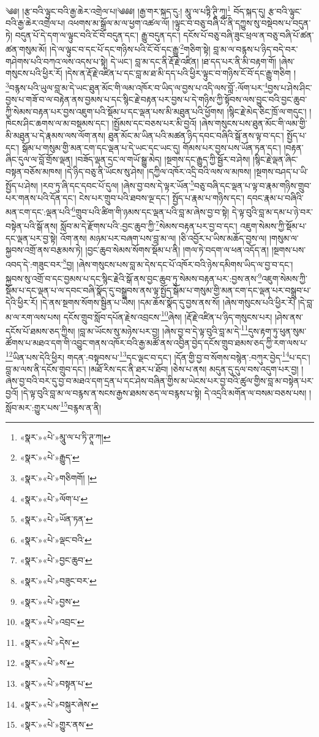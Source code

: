 ༄༅། །རྩ་བའི་ལྟུང་བའི་རྒྱ་ཆེར་འགྲེལ་པ།༄༅༅། །རྒྱ་གར་སྐད་དུ:། མཱུ་ལ་པཏྟི་ཊཱི་ཀཱ།\footnote{«སྣར་»«པེ་»མཱུ་ལ་པ་ཏི་ཊཱ་ཀ།} བོད་སྐད་དུ། རྩ་བའི་ལྟུང་བའི་རྒྱ་ཆེར་འགྲེལ་པ། འཕགས་མ་སྒྲོལ་མ་ལ་ཕྱག་འཚལ་ལོ། །ལྟུང་བ་བཅུ་བཞི་པོ་ནི་དཀྱུས་སུ་བསྡེབས་པ་བདུན་ཏེ། བདུན་པོ་དེ་དག་ལ་ལྟུང་བའི་ངོ་བོ་བདུན་དང་། རྒྱུ་བདུན་དང་། དངོས་པོ་བཅུ་བཞི་ཟུང་ཕྲལ་ན་བཅུ་བཞི་པོ་ཚན་ཚན་གསུམ་མོ། །དེ་ལ་ལྟུང་བ་དང་པོ་དང་གཉིས་པའི་ངོ་བོ་དང་རྒྱུ་\footnote{«སྣར་»«པེ་»རྒྱུད་}གཅིག་སྟེ། བླ་མ་ལ་བརྙས་པ་ཉིད་བདེ་བར་གཤེགས་པའི་བཀའ་ལས་འདས་པ་སྟེ། དེ་ཡང་། བླ་མ་དང་ནི་རྡོ་རྗེ་འཛིན། །ཐ་དད་པར་ནི་མི་བརྟག་གོ། །ཞེས་གསུངས་པའི་ཕྱིར་རོ། །དེས་ན་རྡོ་རྗེ་འཛིན་པ་དང་བླ་མ་ཐ་མི་དད་པའི་ཕྱིར་ལྟུང་བ་གཉིས་ངོ་བོ་དང་རྒྱུ་གཅིག །\footnote{«སྣར་»«པེ་»གཅིགགོ། །}བརྙས་པའི་ཡུལ་བླ་མ་དེ་ཡང་ཐུན་མོང་གི་ལམ་འཁོར་བ་ཡིད་ལ་བྱས་པ་འདི་ལས་བློ་:ལོག་པར་\footnote{«སྣར་»«པེ་»ལོག་པ་}བྱས་པ་ཤེས་ཤིང་བྱས་པ་གཟོ་བ་ལ་བརྟེན་ནས་བྱམས་པ་དང་སྙིང་རྗེ་བརྟན་པར་བྱས་པ་དེ་གཉིས་ཀྱི་སྟོབས་ལས་བྱུང་བའི་བྱང་ཆུབ་ཀྱི་སེམས་བརྟན་པར་བྱས་འཇུག་པའི་སྡོམ་པ་དང་ལྡན་པས་མི་མཐུན་པའི་ཕྱོགས། །སྙིང་རྗེ་མེད་ཅིང་ཁྲོ་ལ་གདུང་། །ཁེངས་ཤིང་ཆགས་ལ་མ་བསྡམས་དང་། །སྤྱོམས་དང་བཅས་པར་མི་བྱའོ། །ཞེས་གསུངས་པས་ཐུན་མོང་གི་ལམ་གྱི་མི་མཐུན་པ་དེ་རྣམས་ལས་ལོག་ནས། ཐུན་མོང་མ་ཡིན་པའི་མཚན་ཉིད་དབང་བཞིའི་སྒོ་ནས་ལྟ་བ་དང་། སྤྱོད་པ་དང་། སྒོམ་པ་གསུམ་གྱི་མན་ངག་དང་ལྡན་པ་དེ་ཡང་དང་ཡང་དུ། གོམས་པར་བྱས་པས་ཡོན་ཏན་དང་། །བརྟན་ཞིང་དུལ་ལ་བློ་གྲོས་ལྡན། །བཟོད་ལྡན་དྲང་ལ་གཡོ་སྒྱུ་མེད། །སྔགས་དང་རྒྱུད་ཀྱི་སྦྱོར་བ་ཤེས། །སྙིང་རྗེ་ལྡན་ཞིང་བསྟན་བཅོས་མཁས། །དེ་ཉིད་བཅུ་ནི་ཡོངས་སུ་ཤེས། །དཀྱིལ་འཁོར་འདྲི་བའི་ལས་ལ་མཁས། །སྔགས་བཤད་པ་ཡི་སྤྱོད་པ་ཤེས། །རབ་ཏུ་ཞི་དང་དབང་པོ་དུལ། །ཞེས་བྱ་བས་དེ་ལྟར་ཡོན་\footnote{«སྣར་»«པེ་»ཡོན་ཏན་}བཅུ་བཞི་དང་ལྡན་པ་ལྟ་བ་རྣམ་གཉིས་གྲུབ་པར་གནས་པའི་དོན་དང་། ངེས་པར་གྲུབ་པའི་ཐབས་ལྔ་དང་། སྤྱོད་པ་རྣམ་པ་གཉིས་དང་། དབང་རྣམ་པ་བཞིའི་མན་ངག་དང་:ལྡན་པའི་\footnote{«སྣར་»«པེ་»ལྡང་བའི་}གྲུབ་པའི་ཚིག་གི་ཉམས་དང་ལྡན་པའི་བླ་མ་ཞེས་བྱ་བ་སྟེ། དེ་ལྟ་བུའི་བླ་མ་དམ་པ་ཉེ་བར་བསྟེན་པའི་སྒོ་ནས། སློབ་མ་དེ་རྫོགས་པའི་:བྱང་ཆུབ་ཀྱི་\footnote{«སྣར་»«པེ་»བྱང་ཆུབ་}སེམས་བརྟན་པར་བྱ་བ་དང་། འཇུག་སེམས་ཀྱི་སྡོམ་པ་དང་ལྡན་པར་བྱ་སྟེ། འོག་ནས། མཉམ་པར་བཞག་པས་བླ་མ་ལ། །ཅི་འབྱོར་པ་ཡིས་མཆོད་བྱས་ལ། །གསུམ་ལ་སྐྱབས་འགྲོ་ནས་བརྩམས་ཏེ། །བྱང་ཆུབ་སེམས་སོགས་སྡོམ་པ་ནི། །གལ་ཏེ་བདག་ལ་ཕན་འདོད་ན། །སྔགས་པས་འབད་དེ་:གཟུང་བར་\footnote{«སྣར་»«པེ་»བཟུང་བར་}བྱ། །ཞེས་གསུངས་པས་བླ་མ་དེས་དང་པོ་འཁོར་བའི་ཉེས་དམིགས་ཡིད་ལ་བྱ་བ་དང་། སྐྱབས་སུ་འགྲོ་བ་དང་བྱམས་པ་དང་སྙིང་རྗེའི་སྒོ་ནས་བྱང་ཆུབ་ཏུ་སེམས་བརྟན་པར་:བྱས་ནས་\footnote{«སྣར་»«པེ་»བྱས་}འཇུག་སེམས་ཀྱི་སྡོམ་པ་དང་ལྡན་པ་ལ་དབང་བཞི་སྣོད་དུ་བསྒྲུབས་ནས་ལྟ་སྤྱོད་སྒོམ་པ་གསུམ་གྱི་མན་ངག་དང་ལྡན་པར་བསྒྲུབ་པ་དེའི་ཕྱིར་རོ། །དེ་ནས་སྔགས་སོགས་སྦྱིན་པ་ཡིས། །དམ་ཆོས་སྣོད་དུ་བྱས་ནས་སོ། །ཞེས་གསུངས་པའི་ཕྱིར་རོ། །དེ་བླ་མ་ལ་རག་ལས་པས། དངོས་གྲུབ་སློབ་དཔོན་རྗེས་འབྲངས་\footnote{«སྣར་»«པེ་»འབྲང་}ཞེས། །རྡོ་རྗེ་འཛིན་པ་ཉིད་གསུངས་པར། །ཤེས་ནས་དངོས་པོ་ཐམས་ཅད་ཀྱིས། །བླ་མ་ཡོངས་སུ་མཉེས་པར་བྱ། །ཞེས་བྱ་བ་དེ་ལྟ་བུའི་བླ་མ་དེ་\footnote{«སྣར་»«པེ་»དེས་}དུས་རྟག་ཏུ་ཕུན་སུམ་ཚོགས་པ་མཐའ་དག་གི་འབྱུང་གནས་འཁོར་བའི་རྒྱ་མཚོ་ནས་འབྱིན་བྱེད་དངོས་གྲུབ་ཐམས་ཅད་ཀྱི་རག་ལས་པ་\footnote{«སྣར་»«པེ་»ས་}ཡིན་པས་དེའི་ཕྱིར། གདན་:བསྟབས་པ་\footnote{«སྣར་»«པེ་»བསྟན་པ་}དང་ལྡང་བ་དང་། །དོན་གྱི་བྱ་བ་སོགས་བསྙེན་:བཀུར་བྱེད་\footnote{«སྣར་»«པེ་»བསྐུར་ཞེས་}པ་དང་། བླ་མ་ལས་ནི་དངོས་གྲུབ་དང་། །མཐོ་རིས་དང་ནི་ཐར་པ་ཐོབ། །ཅེས་པ་ནས། མདུན་དུ་དུལ་བས་འདུག་པར་བྱ། །ཞེས་བྱ་བའི་བར་དུ་བྱ་བ་མཐའ་དག་དྲན་པ་དང་ཤེས་བཞིན་གྱིས་མ་ཡེངས་པར་བྱ་བའི་ཚུལ་གྱིས་བླ་མ་བསྟེན་པར་བྱའོ། །དེ་ལྟ་བུའི་བླ་མ་ལ་བརྙས་ན་སངས་རྒྱས་ཐམས་ཅད་ལ་བརྙས་པ་སྟེ། དེ་འདྲའི་མགོན་ལ་བསམ་བཅས་པས། །སློབ་མར་:གྱུར་པས་\footnote{«སྣར་»«པེ་»གྱུར་ནས་}བརྙས་ན་ནི། 
